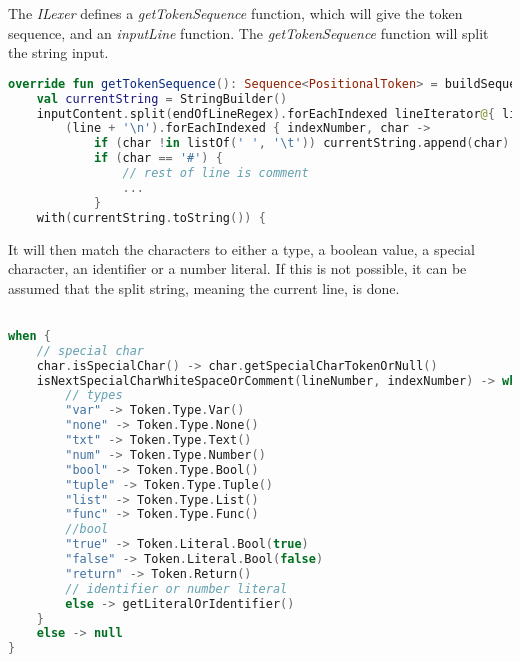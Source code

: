 The \textit{ILexer} defines a \textit{getTokenSequence} function, which will give the token sequence, and an \textit{inputLine} function.
The \textit{getTokenSequence} function will split the string input.
\begin{lstlisting}[language=Kotlin,label=lis:LexerStringSplit,caption=The string is being split and new lines are added to the string .,firstnumber=8]
override fun getTokenSequence(): Sequence<PositionalToken> = buildSequence {
	val currentString = StringBuilder()
	inputContent.split(endOfLineRegex).forEachIndexed lineIterator@{ lineNumber, line ->
		(line + '\n').forEachIndexed { indexNumber, char ->
			if (char !in listOf(' ', '\t')) currentString.append(char)
			if (char == '#') {
				// rest of line is comment
				...
			}
	with(currentString.toString()) {
\end{lstlisting}		
It will then match the characters to either a type, a boolean value, a special character, an identifier or a number literal.
If this is not possible, it can be assumed that the split string, meaning the current line, is done.
\begin{lstlisting}[language=Kotlin,label=lis:LexerStringMatcher,caption=The split string is being matched to a token,firstnumber=19]

when {
	// special char
	char.isSpecialChar() -> char.getSpecialCharTokenOrNull()
	isNextSpecialCharWhiteSpaceOrComment(lineNumber, indexNumber) -> when (this) {
		// types
		"var" -> Token.Type.Var()
		"none" -> Token.Type.None()
		"txt" -> Token.Type.Text()
		"num" -> Token.Type.Number()
		"bool" -> Token.Type.Bool()
		"tuple" -> Token.Type.Tuple()
		"list" -> Token.Type.List()
		"func" -> Token.Type.Func()
		//bool
		"true" -> Token.Literal.Bool(true)
		"false" -> Token.Literal.Bool(false)
		"return" -> Token.Return()
		// identifier or number literal
		else -> getLiteralOrIdentifier()
	}
	else -> null
}
\end{lstlisting}
